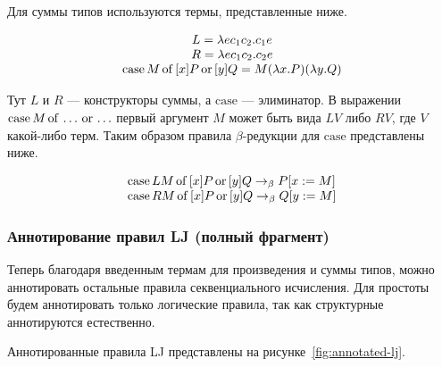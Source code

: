 \documentclass[14pt, russian]{scrartcl}
\begin{document}
Для суммы типов используются термы, представленные ниже.

$$
\begin{array}{c}
L = \lambda e c_1 c_2. c_1 e \\
R = \lambda e c_1 c_2. c_2 e \\
\caseof{M}{[x]P}{[y]Q} = M(\lambda x.P)(\lambda y.Q)
\end{array}$$

Тут $L$ и $R$ --- конструкторы суммы, а $\mathrm{case}$ --- элиминатор. В выражении
$\caseof{M}{\ldots}{\ldots}$ первый аргумент $M$ может быть вида $LV$ либо $RV$,
где $V$ какой-либо терм. Таким образом правила $\beta$-редукции для
$\mathrm{case}$ представлены ниже.


$$
\begin{array}{l}
\caseof{LM}{[x]P}{[y]Q} \rightarrow_\beta P[x := M] \\
\caseof{RM}{[x]P}{[y]Q} \rightarrow_\beta Q[y := M]
\end{array}$$

\subsubsection{Аннотирование правил LJ (полный фрагмент)}
Теперь благодаря введенным термам для произведения и суммы типов, можно аннотировать
остальные правила секвенциального исчисления. Для простоты будем аннотировать только
логические правила, так как структурные аннотируются естественно.

Аннотированные правила LJ представлены на рисунке~\ref{fig:annotated-lj}.
\end{document}
